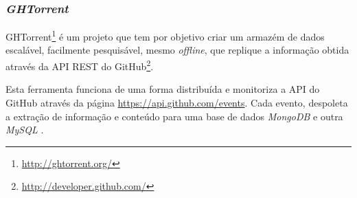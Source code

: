 \subsubsection{\emph{GHTorrent}}

GHTorrent\footnote{\url{http://ghtorrent.org/}} é um projeto que tem por objetivo criar um armazém de dados escalável, facilmente pesquisável, mesmo \emph{offline}, que replique a informação obtida através da API REST do GitHub\footnote{\url{http://developer.github.com/}}.

Esta ferramenta funciona de uma forma distribuída e monitoriza a API do GitHub através da página \url{https://api.github.com/events}. Cada evento, despoleta a extração de informação e conteúdo para uma base de dados \emph{MongoDB} e outra \emph{MySQL} \cite{Gousios2012}.